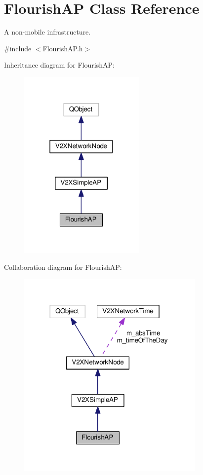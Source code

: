 \hypertarget{classFlourishAP}{}\section{Flourish\+AP Class Reference}
\label{classFlourishAP}


A non-\/mobile infrastructure.  




{\ttfamily \#include $<$Flourish\+A\+P.\+h$>$}



Inheritance diagram for Flourish\+AP\+:\nopagebreak
\begin{figure}[H]
\begin{center}
\leavevmode
\includegraphics[width=175pt]{classFlourishAP__inherit__graph}
\end{center}
\end{figure}


Collaboration diagram for Flourish\+AP\+:\nopagebreak
\begin{figure}[H]
\begin{center}
\leavevmode
\includegraphics[width=260pt]{classFlourishAP__coll__graph}
\end{center}
\end{figure}
